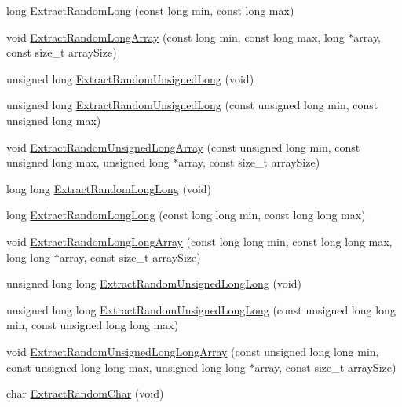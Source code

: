 \begin{DoxyCompactItemize}
\item 
long \hyperlink{classcmn_random_sequence_a7e77852354b662c2ab447179436931b3}{Extract\-Random\-Long} (const long min, const long max)
\item 
void \hyperlink{classcmn_random_sequence_a28b8ca1999b28f1e1a597810ab8e2f23}{Extract\-Random\-Long\-Array} (const long min, const long max, long $\ast$array, const size\-\_\-t array\-Size)
\item 
unsigned long \hyperlink{classcmn_random_sequence_a349e323a2b5a2445ee47949ae1babd1b}{Extract\-Random\-Unsigned\-Long} (void)
\item 
unsigned long \hyperlink{classcmn_random_sequence_a89fd0c4f12a12106261abb7b604fe02b}{Extract\-Random\-Unsigned\-Long} (const unsigned long min, const unsigned long max)
\item 
void \hyperlink{classcmn_random_sequence_aa3e7fa83b4fdde64d7691bb48035c5a8}{Extract\-Random\-Unsigned\-Long\-Array} (const unsigned long min, const unsigned long max, unsigned long $\ast$array, const size\-\_\-t array\-Size)
\item 
long long \hyperlink{classcmn_random_sequence_a4ffccb12c2b0eacf39fb3f0ff33b2db3}{Extract\-Random\-Long\-Long} (void)
\item 
long \hyperlink{classcmn_random_sequence_a885fb0654f9afe0cf199d85c7748ebe0}{Extract\-Random\-Long\-Long} (const long long min, const long long max)
\item 
void \hyperlink{classcmn_random_sequence_a7f1f2984aef4b94a0a3b467dcb8a712d}{Extract\-Random\-Long\-Long\-Array} (const long long min, const long long max, long long $\ast$array, const size\-\_\-t array\-Size)
\item 
unsigned long long \hyperlink{classcmn_random_sequence_ae095c21b6b0656e27d046affc676da19}{Extract\-Random\-Unsigned\-Long\-Long} (void)
\item 
unsigned long long \hyperlink{classcmn_random_sequence_a97b91a8dacaaebd099d635676f61f147}{Extract\-Random\-Unsigned\-Long\-Long} (const unsigned long long min, const unsigned long long max)
\item 
void \hyperlink{classcmn_random_sequence_a27020e01052b3a11265f6861a4492a12}{Extract\-Random\-Unsigned\-Long\-Long\-Array} (const unsigned long long min, const unsigned long long max, unsigned long long $\ast$array, const size\-\_\-t array\-Size)
\item 
char \hyperlink{classcmn_random_sequence_ac6ef7c2be03d15eedbc42cb271226070}{Extract\-Random\-Char} (void)
\item 

\end{DoxyCompactItemize}
